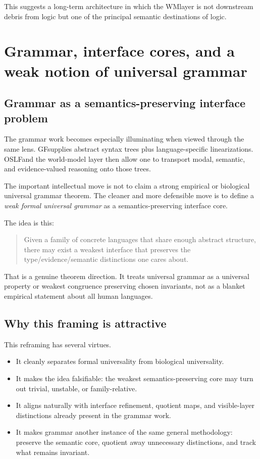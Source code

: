 \documentclass[11pt]{article}
\newcommand{\OSLF}{OSLF}
\newcommand{\WM}{WM}
\newcommand{\GF}{GF}
\begin{document}
This suggests a long-term architecture in which the \WM layer is not downstream debris from logic but one of the principal semantic destinations of logic.

\section{Grammar, interface cores, and a weak notion of universal grammar}

\subsection{Grammar as a semantics-preserving interface problem}

The grammar work becomes especially illuminating when viewed through the same lens. \GF supplies abstract syntax trees plus language-specific linearizations. \OSLF and the world-model layer then allow one to transport modal, semantic, and evidence-valued reasoning onto those trees.

The important intellectual move is not to claim a strong empirical or biological universal grammar theorem. The cleaner and more defensible move is to define a \emph{weak formal universal grammar} as a semantics-preserving interface core.

The idea is this:

\begin{quote}
Given a family of concrete languages that share enough abstract structure, there may exist a weakest interface that preserves the type/evidence/semantic distinctions one cares about.
\end{quote}

That is a genuine theorem direction. It treats universal grammar as a universal property or weakest congruence preserving chosen invariants, not as a blanket empirical statement about all human languages.

\subsection{Why this framing is attractive}

This reframing has several virtues.

\begin{itemize}
  \item It cleanly separates formal universality from biological universality.
  \item It makes the idea falsifiable: the weakest semantics-preserving core may turn out trivial, unstable, or family-relative.
  \item It aligns naturally with interface refinement, quotient maps, and visible-layer distinctions already present in the grammar work.
  \item It makes grammar another instance of the same general methodology: preserve the semantic core, quotient away unnecessary distinctions, and track what remains invariant.
\end{itemize}
\end{document}
